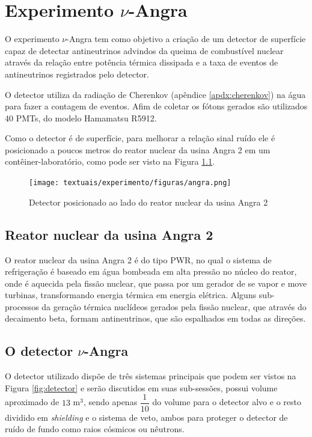 \chapter{Experimento $\nu$-Angra}\label{cap:experimento}
\vspace{-2cm}

O experimento $\nu$-Angra tem como objetivo a criação de um detector de superfície capaz de detectar antineutrinos advindos da queima de combustível nuclear através da relação entre potência térmica dissipada e a taxa de eventos de antineutrinos registrados pelo detector.

O detector utiliza da radiação de Cherenkov (apêndice \ref{apdx:cherenkov}) na água para fazer a contagem de eventos. Afim de coletar os fótons gerados são utilizados 40 PMTs, do modelo Hamamatsu R5912.

Como o detector é de superfície, para melhorar a relação sinal ruído ele é posicionado a poucos metros do reator nuclear da usina Angra 2 em um contêiner-laboratório, como pode ser visto na Figura \ref{fig:angra}.

\begin{figure}[H]
	\centering
	\texttt{[image: textuais/experimento/figuras/angra.png]}
	\caption{Detector posicionado ao lado do reator nuclear da usina Angra 2}
	\label{fig:angra}
\end{figure}

\section{Reator nuclear da usina Angra 2}

O reator nuclear da usina Angra 2 é do tipo \ac{PWR}, no qual o sistema de refrigeração é baseado em água bombeada em alta pressão no núcleo do reator, onde é aquecida pela fissão nuclear, que passa por um gerador de se vapor e move turbinas, transformando energia térmica em energia elétrica. Alguns sub-processos da geração térmica nuclídeos gerados pela fissão nuclear, que através do decaimento beta, formam antineutrinos, que são espalhados em todas as direções.

\section{O detector $\nu$-Angra}

O detector utilizado dispõe de três sistemas principais que podem ser vistos na Figura \ref{fig:detector} e serão discutidos em suas sub-sessões, possui volume aproximado de $13$ m$^3$, sendo apenas $\dfrac{1}{10}$ do volume para o detector alvo e o resto dividido em \emph{shielding} e o sistema de veto, ambos para proteger o detector de ruído de fundo como raios cósmicos ou nêutrons.

